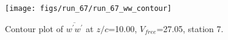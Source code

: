 \begin{figure}[H]
\centering
\texttt{[image: figs/run\_67/run\_67\_ww\_contour]}
\caption{Contour plot of $\overline{w^\prime w^\prime}$ at $z/c$=10.00, $V_{free}$=27.05, station 7.}
\label{fig:run_67_ww_contour}
\end{figure}


